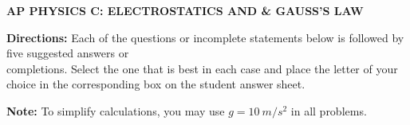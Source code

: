 \documentclass[11pt]{article}
\begin{document}
\pagestyle{fancy}
\chead{}
\lfoot{}\cfoot{-\textsf{\textbf{\thepage}}-}

\begin{center}
  \vspace{-.35in}
  {\large
    \textbf{AP PHYSICS C: ELECTROSTATICS AND \& GAUSS'S LAW}
  }
\end{center}

\textbf{Directions:} Each of the questions or incomplete statements below is
followed by five suggested answers or\\
completions. Select the one that is best
in each case and place the letter of your choice in the corresponding box on
the student answer sheet.

\vspace{10pt}\textbf{Note:} To simplify calculations, you may use
$g=\SI{10}{m/s^2}$ in all problems.
\end{document}
